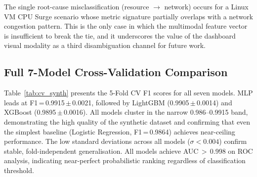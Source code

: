 \documentclass[5p, times]{elsarticle}
\begin{document}
\begin{table}[h!]
\centering
\caption{Performance results for full RCA pipeline }
\label{tab:rca_perf}
\end{table}

The single root-cause misclassification (resource $\to$ network) occurs for a Linux VM CPU Surge scenario whose metric signature partially overlaps with a network congestion pattern. This is the only case in which the multimodal feature vector is insufficient to break the tie, and it underscores the value of the dashboard visual modality as a third disambiguation channel for future work.

\subsection{Full 7-Model Cross-Validation Comparison}

Table~\ref{tab:cv_synth} presents the 5-Fold CV F1 scores for all seven models. MLP leads at F1\,=\,0.9915\,$\pm$\,0.0021, followed by LightGBM (0.9905\,$\pm$\,0.0014) and XGBoost (0.9895\,$\pm$\,0.0016). All models cluster in the narrow 0.986--0.9915 band, demonstrating the high quality of the synthetic dataset and confirming that even the simplest baseline (Logistic Regression, F1\,=\,0.9864) achieves near-ceiling performance.
The low standard deviations across all models ($\sigma < 0.004$) confirm stable, fold-independent generalisation. All models achieve AUC\,$>$\,0.998 on ROC analysis, indicating near-perfect probabilistic ranking regardless of classification threshold.
\end{document}
